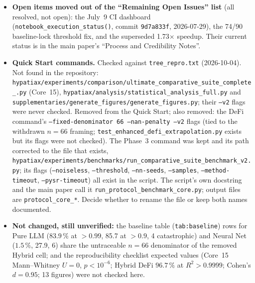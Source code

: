 \documentclass[11pt]{article}
\begin{document}
\begin{itemize}
\item \textbf{Open items moved out of the ``Remaining Open Issues'' list} (all resolved, not open): the July~9 CI dashboard
(\texttt{notebook\_execution\_status()}, commit \texttt{9d7a833f}, 2026-07-29), the 74/90 baseline-lock threshold fix, and the superseded 1.73$\times$ speedup.
Their current status is in the main paper's ``Process and Credibility Notes''.
\item \textbf{Quick Start commands.} Checked against \texttt{tree\_repro.txt} (2026-10-04). Not found in the repository: \texttt{hypatiax/experiments/comparison/ultimate\_comparative\_suite\_complete\_.py}
(Core~15), \texttt{hypatiax/analysis/statistical\_analysis\_full.py} and \texttt{supplementaries/generate\_figures/generate\_figures.py}; their \texttt{--v2} flags
were never checked. Removed from the Quick Start; also removed: the DeFi command's \texttt{--fixed-denominator 66 --nan-penalty --v2} flags (tied to the withdrawn $n{=}66$
framing; \texttt{test\_enhanced\_defi\_extrapolation.py} exists but its flags were not checked). The Phase~3 command was kept and its path corrected to the file
that exists, \texttt{hypatiax/experiments/benchmarks/run\_comparative\_suite\_benchmark\_v2.py}; its flags (\texttt{--noiseless}, \texttt{--threshold},
\texttt{--nn-seeds}, \texttt{--samples}, \texttt{--method-timeout}, \texttt{--pysr-timeout}) all exist in the script. The script's own docstring and the main paper call it
\texttt{run\_protocol\_benchmark\_core.py}; output files are \texttt{protocol\_core\_*}. Decide whether to rename the file or keep both names documented.
\item \textbf{Not changed, still unverified:} the baseline table (\texttt{tab:baseline}) rows for Pure LLM ($83.9\,\%$ at $>0.99$, 85.7 at $>0.9$, 4 catastrophic) and Neural Net
($1.5\,\%$, 27.9, 6) share the untraceable $n{=}66$ denominator of the removed Hybrid cell; and the reproducibility checklist expected values (Core~15 Mann--Whitney
$U=0$, $p<10^{-6}$; Hybrid DeFi $96.7\,\%$ at $R^2>0.9999$; Cohen's $d=0.95$; 13 figures) were not checked here.
\end{itemize}
\end{document}
